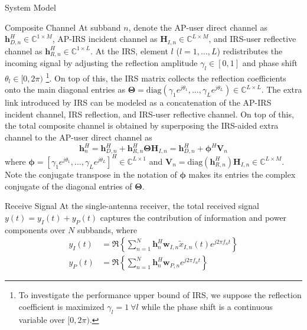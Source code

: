 \documentclass[journal]{IEEEtran}
\begin{document}
\begin{section}{System Model}
		\begin{subsection}{Composite Channel}
			At subband $n$, denote the AP-user direct channel as $\boldsymbol{h}_{D,n}^H \in \mathbb{C}^{1 \times M}$, AP-IRS incident channel as $\boldsymbol{H}_{I,n} \in \mathbb{C}^{L \times M}$, and IRS-user reflective channel as $\boldsymbol{h}_{R,n}^H \in \mathbb{C}^{1 \times L}$. At the IRS, element $l$ ($l=1,\dots,L$) redistributes the incoming signal by adjusting the reflection amplitude $\gamma_l \in [0,1]$ and phase shift $\theta_l \in [0,2\pi)$ \footnote{To investigate the performance upper bound of IRS, we suppose the reflection coefficient is maximized $\gamma_l=1 \ \forall l$ while the phase shift is a continuous variable over $[0,2\pi)$.}. On top of this, the IRS matrix collects the reflection coefficients onto the main diagonal entries as $\boldsymbol{\Theta} = \mathrm{diag}(\gamma_1 e^{j \theta_1}, \dots, \gamma_L e^{j \theta_L}) \in \mathbb{C}^{L \times L}$. The extra link introduced by IRS can be modeled as a concatenation of the AP-IRS incident channel, IRS reflection, and IRS-user reflective channel. On top of this, the total composite channel is obtained by superposing the IRS-aided extra channel to the AP-user direct channel as
			\begin{equation}\label{eq:h_n}
				\boldsymbol{h}_{n}^H = \boldsymbol{h}_{D,n}^H + \boldsymbol{h}_{R,n}^H \boldsymbol{\Theta} \boldsymbol{H}_{I,n} = \boldsymbol{h}_{D,n}^H + \boldsymbol{\phi}^H \boldsymbol{V}_{n}
			\end{equation}
			where $\boldsymbol{\phi}=[\gamma_1 e^{j \theta_1}, \dots, \gamma_L e^{j \theta_L}]^H \in \mathbb{C}^{L \times 1}$ and $\boldsymbol{V}_{n}=\mathrm{diag}(\boldsymbol{h}_{R,n}^H)\boldsymbol{H}_{I,n} \in \mathbb{C}^{L \times M}$. Note the conjugate transpose in the notation of $\boldsymbol{\phi}$ makes its entries the complex conjugate of the diagonal entries of $\boldsymbol{\Theta}$.
		\end{subsection}


		\begin{subsection}{Receive Signal}
			At the single-antenna receiver, the total received signal $y(t)=y_I(t)+y_P(t)$ captures the contribution of information and power components over $N$ subbands, where
			\begin{align}\label{eq:y_IP}
				y_{I}(t) & = \Re\left\{\sum_{n=1}^N{\boldsymbol{h}_{n}^H}{\boldsymbol{w}_{I,n}\tilde{x}_{I,n}(t)}{e^{j2{\pi}{f_n}{t}}}\right\}\\
				y_{P}(t) & = \Re\left\{\sum_{n=1}^N{\boldsymbol{h}_{n}^H}\boldsymbol{w}_{P,n}{e^{j2{\pi}{f_n}{t}}}\right\}
			\end{align}
		\end{subsection}



\end{section}
\end{document}
